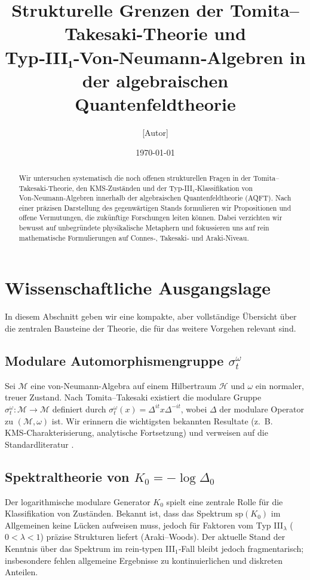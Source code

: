\documentclass[12pt, a4paper]{article}
\title{Strukturelle Grenzen der Tomita–Takesaki-Theorie und Typ‑III₁‑Von‑Neumann‑Algebren in der algebrais­chen Quantenfeldtheorie}
\author{[Autor]
}
\date{\today}
\begin{document}
\maketitle

\begin{abstract}
Wir untersuchen systematisch die noch offenen strukturellen Fragen in der Tomita–Takesaki-Theorie, den KMS‑Zuständen und der Typ‑III₁‑Klassifikation von Von‑Neumann‑Algebren innerhalb der algebraischen Quantenfeldtheorie (AQFT). Nach einer präzisen Darstellung des gegenwärtigen Stands formulieren wir Propositionen und offene Vermutungen, die zukünftige Forschungen leiten können. Dabei verzichten wir bewusst auf unbegründete physikalische Metaphern und fokussieren uns auf rein mathematische Formulierungen auf Connes‑, Takesaki‑ und Araki‑Niveau.
\end{abstract}

\tableofcontents
\newpage

\section{Wissenschaftliche Ausgangslage}
In diesem Abschnitt geben wir eine kompakte, aber vollständige Übersicht über die zentralen Bausteine der Theorie, die für das weitere Vorgehen relevant sind.

\subsection{Modulare Automorphismengruppe $\sigma_t^{\omega}$}
Sei $\mathcal{M}$ eine von-Neumann-Algebra auf einem Hilbertraum $\mathcal{H}$ und $\omega$ ein normaler, treuer Zustand. Nach Tomita–Takesaki existiert die modulare Gruppe $\sigma_t^{\omega}:\mathcal{M}\to\mathcal{M}$ definiert durch $\sigma_t^{\omega}(x)=\Delta^{it}x\Delta^{-it}$, wobei $\Delta$ der modulare Operator zu $(\mathcal{M},\omega)$ ist. Wir erinnern die wichtigsten bekannten Resultate (z.~B. KMS‑Charakterisierung, analytische Fortsetzung) und verweisen auf die Standardliteratur \cite{Connes1973,Takesaki2003}.

\subsection{Spektraltheorie von $K_0 = -\log\Delta_0$}
Der logarithmische modulare Generator $K_0$ spielt eine zentrale Rolle für die Klassifikation von Zuständen. Bekannt ist, dass das Spektrum $\mathrm{sp}(K_0)$ im Allgemeinen keine Lücken aufweisen muss, jedoch für Faktoren vom Typ III$_\lambda$ ($0<\lambda<1$) präzise Strukturen liefert (Araki–Woods). Der aktuelle Stand der Kenntnis über das Spektrum im rein‑typen III$_1$‑Fall bleibt jedoch fragmentarisch; insbesondere fehlen allgemeine Ergebnisse zu kontinuierlichen und diskreten Anteilen.
\end{document}
